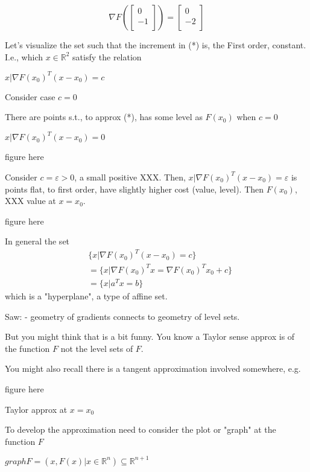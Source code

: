 \begin{displaymath}
\nabla F \left( \begin{bmatrix} 0\\ -1\\ \end{bmatrix} \right)  =
\begin{bmatrix} 0\\ -2\\ \end{bmatrix}
\end{displaymath}

Let's visualize the set such that the increment in (*) is, 
the First order, constant.
I.e., which $x \in \mathbb{R}^2$ satisfy the relation

${x | \nabla F(x_0)^{T} (x-x_0) = c}$


Consider case $c=0$

There are points s.t., to approx (*), has some level as $F(x_0)$ when $c=0$

${x | \nabla F(x_0)^{T} (x-x_0) = 0}$

figure here


Consider $c = \varepsilon > 0$, a small positive XXX. Then, 
${x | \nabla F(x_0)^{T} (x-x_0) = \varepsilon}$
is points flat, to first order, have slightly higher cost (value, level). Then $F(x_0)$, XXX value at $x=x_0$.

figure here

In general the set
\begin{align*}
&\{x | \nabla F(x_0)^{T} (x-x_0) = c\}\\
&= \{x | \nabla F(x_0)^{T} x = \nabla F(x_0)^{T} x_0 + c\} \\
&= \{x | a^{T}x = b\}
\end{align*}
which is a "hyperplane", a type of affine set. 


Saw: - geometry of gradients connects to geometry of level sets. 

But you might think that is a bit funny. You know a Taylor sense approx is of the function $F$ not the level sets of $F$. 

You might also recall there is a tangent approximation involved somewhere, e.g. 

figure here

Taylor approx at $x = x_0$

To develop the approximation need to consider the plot or "graph" at the function $F$

$graph F = {(x, F(x) | x \in \mathbb{R}^n)} \subseteq \mathbb{R}^{n+1}$

